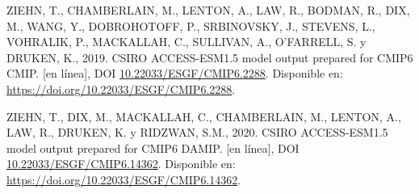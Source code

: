 \documentclass[12pt,oneside,a4paper]{reedthesis}
\newlength{\cslhangindent}
\newenvironment{CSLReferences}[2] %
 {%
  \setlength{\parindent}{0pt}
  \ifodd #1 \everypar{\setlength{\hangindent}{\cslhangindent}}\ignorespaces\fi
  \ifnum #2 > 0
  \setlength{\parskip}{#2\baselineskip}
  \fi
 }%
 {}
\begin{document}
\begin{CSLReferences}{1}{0}
\leavevmode{}%
ZIEHN, T., CHAMBERLAIN, M., LENTON, A., LAW, R., BODMAN, R., DIX, M., WANG, Y., DOBROHOTOFF, P., SRBINOVSKY, J., STEVENS, L., VOHRALIK, P., MACKALLAH, C., SULLIVAN, A., O'FARRELL, S. y DRUKEN, K., 2019. CSIRO ACCESS-ESM1.5 model output prepared for CMIP6 CMIP. {[}en línea{]}, DOI \href{https://doi.org/10.22033/ESGF/CMIP6.2288}{10.22033/ESGF/CMIP6.2288}. Disponible en: \url{https://doi.org/10.22033/ESGF/CMIP6.2288}.

\leavevmode{}%
ZIEHN, T., DIX, M., MACKALLAH, C., CHAMBERLAIN, M., LENTON, A., LAW, R., DRUKEN, K. y RIDZWAN, S.M., 2020. CSIRO ACCESS-ESM1.5 model output prepared for CMIP6 DAMIP. {[}en línea{]}, DOI \href{https://doi.org/10.22033/ESGF/CMIP6.14362}{10.22033/ESGF/CMIP6.14362}. Disponible en: \url{https://doi.org/10.22033/ESGF/CMIP6.14362}.

\end{CSLReferences}


\end{document}
